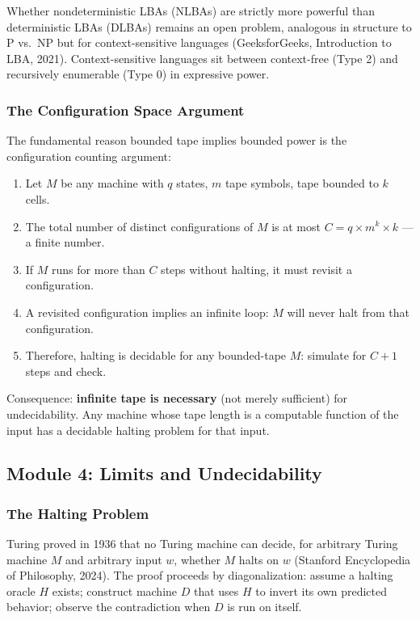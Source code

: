 \documentclass[11pt,letterpaper]{article}
\begin{document}
Whether nondeterministic LBAs (NLBAs) are strictly more powerful than deterministic LBAs (DLBAs) remains an open problem, analogous in structure to P vs.\ NP but for context-sensitive languages (GeeksforGeeks, Introduction to LBA, 2021). Context-sensitive languages sit between context-free (Type 2) and recursively enumerable (Type 0) in expressive power.

\subsubsection{The Configuration Space Argument}

The fundamental reason bounded tape implies bounded power is the configuration counting argument:

\begin{enumerate}
  \item Let $M$ be any machine with $q$ states, $m$ tape symbols, tape bounded to $k$ cells.
  \item The total number of distinct configurations of $M$ is at most $C = q \times m^k \times k$ --- a finite number.
  \item If $M$ runs for more than $C$ steps without halting, it must revisit a configuration.
  \item A revisited configuration implies an infinite loop: $M$ will never halt from that configuration.
  \item Therefore, halting is decidable for any bounded-tape $M$: simulate for $C+1$ steps and check.
\end{enumerate}

Consequence: \textbf{infinite tape is necessary} (not merely sufficient) for undecidability. Any machine whose tape length is a computable function of the input has a decidable halting problem for that input.

\subsection{Module 4: Limits and Undecidability}

\subsubsection{The Halting Problem}

Turing proved in 1936 that no Turing machine can decide, for arbitrary Turing machine $M$ and arbitrary input $w$, whether $M$ halts on $w$ (Stanford Encyclopedia of Philosophy, 2024). The proof proceeds by diagonalization: assume a halting oracle $H$ exists; construct machine $D$ that uses $H$ to invert its own predicted behavior; observe the contradiction when $D$ is run on itself.
\end{document}
